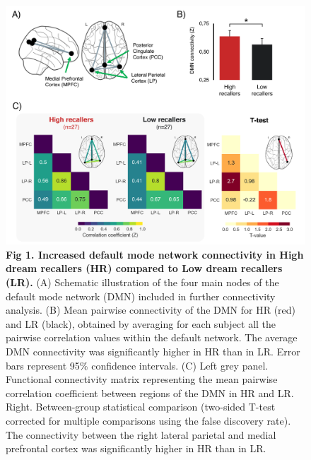 \begin{figure}[!htbp]
	\includegraphics[width=\textwidth]{Fig/Results/Inertia/Creativity/Fig1.png}
	\caption*{\textbf{Fig 1. Increased default mode network connectivity in High dream recallers (HR) compared to Low dream recallers (LR).} (A) Schematic illustration of the four main nodes of the default mode network (DMN) included in further connectivity analysis. (B) Mean pairwise connectivity of the DMN for HR (red) and LR (black), obtained by averaging for each subject all the pairwise correlation values within the default network. The average DMN connectivity was significantly higher in HR than in LR. Error bars represent 95\% confidence intervals. (C) Left grey panel. Functional connectivity matrix representing the mean pairwise correlation coefficient between regions of the DMN in HR and LR. Right. Between-group statistical comparison (two-sided T-test corrected for multiple comparisons using the false discovery rate). The connectivity between the right lateral parietal and medial prefrontal cortex was significantly higher in HR than in LR.}
\end{figure}

